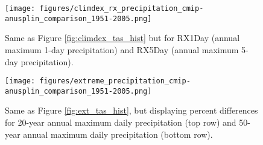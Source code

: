\documentclass[]{scrartcl}
\begin{document}
\begin{figure}[ht!]
	\centering
	\texttt{[image: figures/climdex\_rx\_precipitation\_cmip-anusplin\_comparison\_1951-2005.png]}
	\caption[Tas]{Same as Figure \ref{fig:climdex_tas_hist} but for RX1Day (annual maximum 1-day precipitation) and RX5Day (annual maximum 5-day precipitation).}
	\label{fig:climdex_pr_hist}
\end{figure}

\begin{figure}[ht!]
	\centering
	\texttt{[image: figures/extreme\_precipitation\_cmip-anusplin\_comparison\_1951-2005.png]}
	\caption[Pr]{Same as Figure \ref{fig:ext_tas_hist}, but displaying percent differences for 20-year annual maximum daily precipitation (top row) and 50-year annual maximum daily precipitation (bottom row).}
	\label{fig:ext_pr_hist}
\end{figure}
\end{document}
